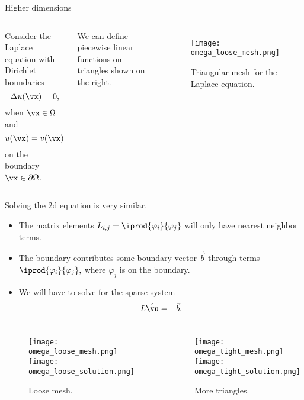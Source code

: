 \begin{frame}{Higher dimensions}
	\begin{columns}[T,onlytextwidth]
		Consider the Laplace equation with Dirichlet boundaries
		\[ \Delta u(\vx) = 0, \]
		when $ \vx \in \Omega $ and 
		\[ u(\vx) = v(\vx) \]
		on the boundary $ \vx \in \partial \Omega $.
		
		\pause
		We can define piecewise linear functions on triangles shown on the right. 
		
		\begin{figure}
			\centering
			\texttt{[image: omega\_loose\_mesh.png]}
			\caption{Triangular mesh for the Laplace equation.}
		\end{figure}
	\end{columns}
\end{frame}

\begin{frame}
	Solving the 2d equation is very similar. 
	\begin{itemize}[<+->]
		\item The matrix elements $ L_{i,j} = \iprod{\varphi_i}{\varphi_j} $ will only have nearest neighbor terms. 
		\item The boundary contributes some boundary vector $ \vec{b} $ through terms $ \iprod{\varphi_i}{\varphi_j}, $ where $ \varphi_j $ is on the boundary.
		\item We will have to solve for the sparse system 
		\[ L \hat{\vu} = -\vec{b}. \]
	\end{itemize}
\end{frame}

\begin{frame}
	\begin{columns}[T,onlytextwidth]
		\begin{figure}
			\centering
			\texttt{[image: omega\_loose\_mesh.png]}\\
			\texttt{[image: omega\_loose\_solution.png]}
			\caption{Loose mesh.}
		\end{figure}
		
		\begin{figure}
			\centering
			\texttt{[image: omega\_tight\_mesh.png]}\\
			\texttt{[image: omega\_tight\_solution.png]}
			\caption{More triangles.}
		\end{figure}
	\end{columns}
\end{frame}


